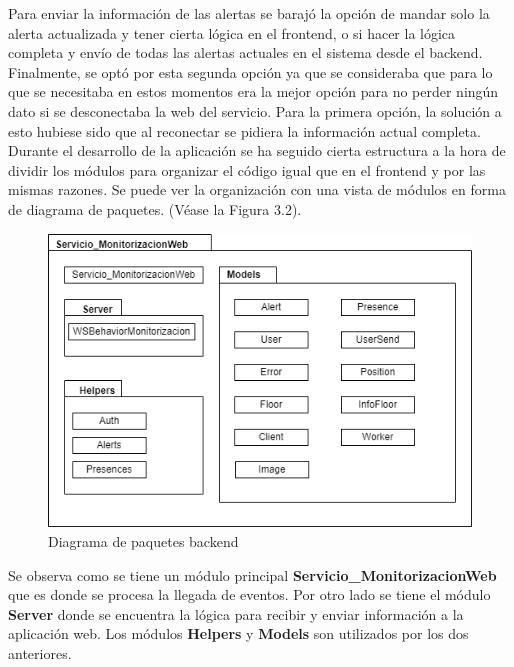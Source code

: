 Para enviar la información de las alertas se barajó la opción de mandar solo la alerta actualizada y tener cierta lógica en el frontend, o si hacer la lógica completa y envío de todas las alertas actuales en el sistema desde el backend. Finalmente, se optó por esta segunda opción ya que se consideraba que para lo que se necesitaba en estos momentos era la mejor opción para no perder ningún dato si se desconectaba la web del servicio. Para la primera opción, la solución a esto hubiese sido que al reconectar se pidiera la información actual completa.\\

Durante el desarrollo de la aplicación se ha seguido cierta estructura a la hora de dividir los módulos para organizar el código igual que en el frontend y por las mismas razones. Se puede ver la organización con una vista de módulos en forma de diagrama de paquetes. (Véase la Figura 3.2).\\

\begin{figure}[H]
    \centering
    \includegraphics[width=12cm]{Imagenes/Diagrama-paquetes-backend}
    \caption{Diagrama de paquetes backend}
    \label{fig:paquetes-backend}
\end{figure}

Se observa como se tiene un módulo principal \textbf{Servicio\_MonitorizacionWeb} que es donde se procesa la llegada de eventos. Por otro lado se tiene el módulo \textbf{Server} donde se encuentra la lógica para recibir y enviar información a la aplicación web. Los módulos \textbf{Helpers} y \textbf{Models} son utilizados por los dos anteriores.\\

